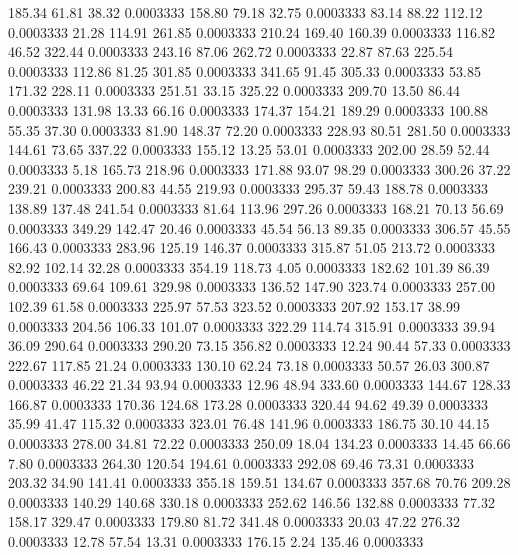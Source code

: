  185.34   61.81   38.32   0.0003333
 158.80   79.18   32.75   0.0003333
  83.14   88.22  112.12   0.0003333
  21.28  114.91  261.85   0.0003333
 210.24  169.40  160.39   0.0003333
 116.82   46.52  322.44   0.0003333
 243.16   87.06  262.72   0.0003333
  22.87   87.63  225.54   0.0003333
 112.86   81.25  301.85   0.0003333
 341.65   91.45  305.33   0.0003333
  53.85  171.32  228.11   0.0003333
 251.51   33.15  325.22   0.0003333
 209.70   13.50   86.44   0.0003333
 131.98   13.33   66.16   0.0003333
 174.37  154.21  189.29   0.0003333
 100.88   55.35   37.30   0.0003333
  81.90  148.37   72.20   0.0003333
 228.93   80.51  281.50   0.0003333
 144.61   73.65  337.22   0.0003333
 155.12   13.25   53.01   0.0003333
 202.00   28.59   52.44   0.0003333
   5.18  165.73  218.96   0.0003333
 171.88   93.07   98.29   0.0003333
 300.26   37.22  239.21   0.0003333
 200.83   44.55  219.93   0.0003333
 295.37   59.43  188.78   0.0003333
 138.89  137.48  241.54   0.0003333
  81.64  113.96  297.26   0.0003333
 168.21   70.13   56.69   0.0003333
 349.29  142.47   20.46   0.0003333
  45.54   56.13   89.35   0.0003333
 306.57   45.55  166.43   0.0003333
 283.96  125.19  146.37   0.0003333
 315.87   51.05  213.72   0.0003333
  82.92  102.14   32.28   0.0003333
 354.19  118.73    4.05   0.0003333
 182.62  101.39   86.39   0.0003333
  69.64  109.61  329.98   0.0003333
 136.52  147.90  323.74   0.0003333
 257.00  102.39   61.58   0.0003333
 225.97   57.53  323.52   0.0003333
 207.92  153.17   38.99   0.0003333
 204.56  106.33  101.07   0.0003333
 322.29  114.74  315.91   0.0003333
  39.94   36.09  290.64   0.0003333
 290.20   73.15  356.82   0.0003333
  12.24   90.44   57.33   0.0003333
 222.67  117.85   21.24   0.0003333
 130.10   62.24   73.18   0.0003333
  50.57   26.03  300.87   0.0003333
  46.22   21.34   93.94   0.0003333
  12.96   48.94  333.60   0.0003333
 144.67  128.33  166.87   0.0003333
 170.36  124.68  173.28   0.0003333
 320.44   94.62   49.39   0.0003333
  35.99   41.47  115.32   0.0003333
 323.01   76.48  141.96   0.0003333
 186.75   30.10   44.15   0.0003333
 278.00   34.81   72.22   0.0003333
 250.09   18.04  134.23   0.0003333
  14.45   66.66    7.80   0.0003333
 264.30  120.54  194.61   0.0003333
 292.08   69.46   73.31   0.0003333
 203.32   34.90  141.41   0.0003333
 355.18  159.51  134.67   0.0003333
 357.68   70.76  209.28   0.0003333
 140.29  140.68  330.18   0.0003333
 252.62  146.56  132.88   0.0003333
  77.32  158.17  329.47   0.0003333
 179.80   81.72  341.48   0.0003333
  20.03   47.22  276.32   0.0003333
  12.78   57.54   13.31   0.0003333
 176.15    2.24  135.46   0.0003333
